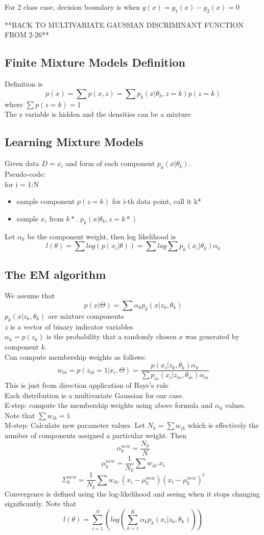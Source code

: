 \documentclass[11pt,psfig]{article}
\begin{document}
For 2 class case, decision boundary is when $g(x) = g_1(x)-g_2(x) = 0$

**BACK TO MULTIVARIATE GAUSSIAN DISCRIMINANT FUNCTION FROM 2-26**

\subsection*{Finite Mixture Models Definition}
Definition is
\[
p(x) = \sum{p(x,z)} = \sum p_k(x|\theta_k,z=k)p(z=k)
\]
where $\sum{p(z=k)}=1$
\\
The z variable is hidden and the densities can be a mixture

\subsection*{Learning Mixture Models}

Given data $D={x_i}$ and form of each component $p_k(x|\theta_k)$. 
\\
Pseudo-code:
\\
for i = 1:N
\begin{itemize}
\item sample component $p(z=k)$ for i-th data point, call it k*
\item sample $x_i$ from $k*$. $p_k(x|\theta_k,z=k*)$
\end{itemize}

Let $\alpha_k$ be the component weight, then log likelihood is
\[
l(\theta) = \sum{log(p(x_i|\theta))} = \sum{log\sum{p_k(x_i|\theta_k)\alpha_k}}
\]

\subsection*{The EM algorithm}

We assume that
\[
p(x|\Theta) = \sum{\alpha_k p_k(x|z_k,\theta_k)}
\]
$p_k(x|z_k,\theta_k)$ are mixture components\\
$z$ is a vector of binary indicator variables\\
$\alpha_k = p(z_k)$ is the probability that a randomly chosen $x$ was generated by component $k$. \\
Can compute membership weights as follows:
\[
w_{ik} = p(z_{ik}=1|x_i,\Theta) = \frac{p(x_i|z_k,\theta_k)\alpha_k}{\sum{p_m(x_i|z_m,\theta_m)\alpha_m}}
\]
This is just from direction application of Baye's rule\\
Each distribution is a multivariate Gaussian for our case. \\
E-step: compute the membership weights using above formula and $\alpha_k$ values. \\
Note that $\sum{w_{ik}} = 1$
\\
M-step: Calculate new parameter values. Let $N_k = \sum{w_{ik}}$ which is effectively the number of components assigned a particular weight. Then
\[
\alpha_k^{new} = \frac{N_k}{N}
\]
\[
\mu_k^{new} = \frac{1}{N_k} \sum{w_{ik}.x_i}
\]
\[
\Sigma_k^{new} = \frac{1}{N_k} \sum{w_{ik}.(x_i-\mu_k^{new})(x_i-\mu_k^{new})^t}
\]
Convergence is defined using the log-likelihood and seeing when it stops changing significantly. Note that
\[
l(\theta) = \sum_{i=1}^N{(log(\sum_{k=1}^K{\alpha_k p_k(x_i|z_k,\theta_k)}))}
\]
\end{document}
